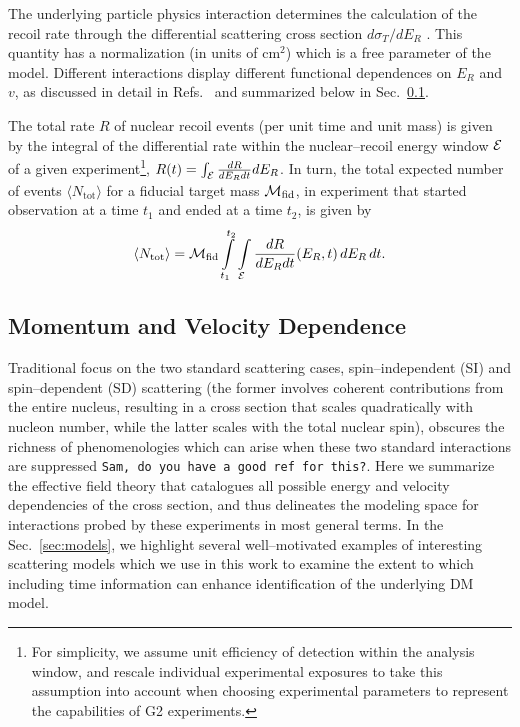 \documentclass[11pt]{article}
\newcommand{\beq}{\begin{equation}} \newcommand{\eeq}{\end{equation}}
\newcommand{\Sec}[1]{Sec.~\ref{#1}} \newcommand{\Secs}[2]{Secs.~\ref{#1} and \ref{#2}} \newcommand{\Secm}[2]{Secs.~\ref{#1} through \ref{#2}}
\newcommand{\sjwColor}{red}
\newcommand{\sjwtt}[1]{{\color{\sjwColor}\tt #1}}
\begin{document}
The underlying particle physics interaction determines the calculation of the recoil rate through the differential scattering cross section ${d\sigma_T}/{dE_R}$ \cite{Gluscevic:2015sqa,Gresham:2014vja}. This quantity has a normalization (in units of cm${}^2$) which is a free parameter of the model. Different interactions display different functional dependences on $E_R$ and $v$, as discussed in detail in Refs.~\cite{Gluscevic:2015sqa,Gresham:2014vja} and summarized below in \Sec{subsec:momentum_velocity}.

The total rate $R$ of nuclear recoil events (per unit time and unit mass) is given by the integral of the differential rate within the nuclear--recoil energy window ${\cal E}$ of a given experiment\footnote{For simplicity, we assume unit efficiency of detection within the analysis window, and rescale individual experimental exposures to take this assumption into account when choosing experimental parameters to represent the capabilities of G2 experiments.}, $R(t)=\int_{\cal E} \frac{dR}{dE_R dt} dE_R$. In turn, the total expected number of events $\langle N_\mathrm{tot}\rangle$ for a fiducial target mass ${\cal M}_\textrm{fid}$, in experiment that started observation at a time $t_1$ and ended at a time $t_2$, is given by
\beq \label{eq:totevents}
\langle N_\mathrm{tot}\rangle =  \cM_\textrm{fid} \int\limits_{t_1}^{t_2} \int\limits_\cE  \frac{dR}{dE_R dt}(E_R,t)\,dE_R \,dt.
\eeq


\subsection{Momentum and Velocity Dependence}
\label{subsec:momentum_velocity}

Traditional focus on the two standard scattering cases, spin--independent (SI) and spin--dependent (SD) scattering (the former involves coherent contributions from the entire nucleus, resulting in a cross section that scales quadratically with nucleon number, while the latter scales with the total nuclear spin), obscures the richness of phenomenologies which can arise when these two standard interactions are suppressed \cite{} \sjwtt{Sam, do you have a good ref for this?}. Here we summarize the effective field theory that catalogues all possible energy and velocity dependencies of the cross section, and thus delineates the modeling space for interactions probed by these experiments in most general terms. In the \Sec{sec:models}, we highlight several well--motivated examples of interesting scattering models which we use in this work to examine the extent to which including time information can enhance identification of the underlying DM model.
\end{document}
